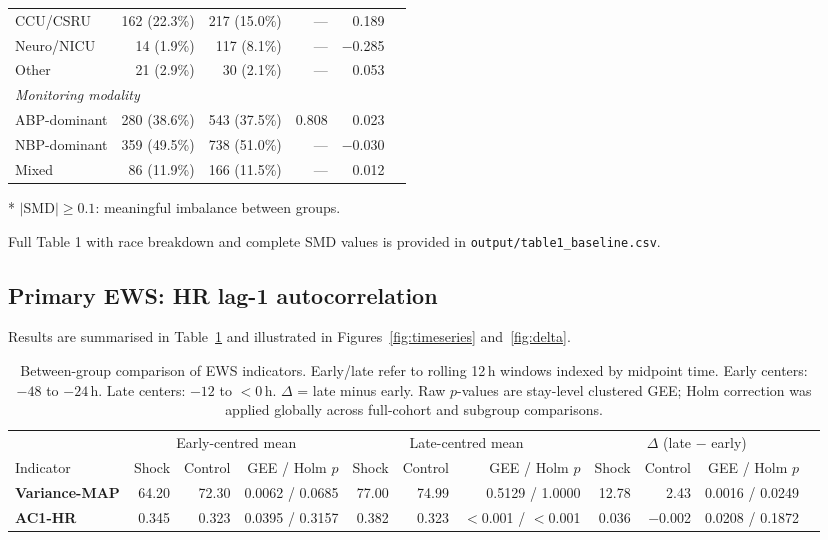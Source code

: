 \documentclass[referee,lineno,pdflatex]{sn-article-template/sn-jnl}
\begin{document}
\begin{table}[ht]
\begin{tabular}{lrrrrr}
CCU/CSRU              & 162 (22.3\%) & 217 (15.0\%) & --- & 0.189 \\
Neuro/NICU            & 14 (1.9\%)  & 117 (8.1\%)  & --- & $-$0.285 \\
Other                 & 21 (2.9\%)  & 30 (2.1\%)  & --- & 0.053 \\
\midrule
\multicolumn{5}{l}{\textit{Monitoring modality}} \\
ABP-dominant          & 280 (38.6\%) & 543 (37.5\%)  & 0.808 & 0.023 \\
NBP-dominant          & 359 (49.5\%) & 738 (51.0\%) & --- & $-$0.030 \\
Mixed                 & 86 (11.9\%) & 166 (11.5\%)  & --- & 0.012 \\
\bottomrule
\end{tabular}
\begin{tablenotes}
  \item[*] $|$SMD$| \geq 0.1$: meaningful imbalance between groups.
  \item Full Table 1 with race breakdown and complete SMD values is provided in
        \texttt{output/table1\_baseline.csv}.
\end{tablenotes}
\end{table}

\subsection{Primary EWS: HR lag-1 autocorrelation}
\label{sec:res-main}

Results are summarised in Table~\ref{tab:main} and illustrated in
Figures~\ref{fig:timeseries} and~\ref{fig:delta}.

\begin{table}
\caption{%
  Between-group comparison of EWS indicators.
  Early/late refer to rolling 12\,h windows indexed by midpoint time.
  Early centers: $-48$ to $-24$\,h. Late centers: $-12$ to $<0$\,h.
  $\Delta$ = late minus early.
  Raw $p$-values are stay-level clustered GEE; Holm correction was applied globally
  across full-cohort and subgroup comparisons.
}
\label{tab:main}
\begin{tabular}{lrrrrrrrrrr}
\toprule
 & \multicolumn{3}{c}{Early-centred mean} & \multicolumn{3}{c}{Late-centred mean} & \multicolumn{3}{c}{$\Delta$ (late $-$ early)} \\
\cmidrule(r){2-4} \cmidrule(r){5-7} \cmidrule(r){8-10}
Indicator & Shock & Control & GEE / Holm $p$ & Shock & Control & GEE / Holm $p$ & Shock & Control & GEE / Holm $p$ \\
\midrule
\textbf{Variance-MAP} & 64.20 & 72.30 & 0.0062 / 0.0685 & 77.00 & 74.99 & 0.5129 / 1.0000 & 12.78 & 2.43 & 0.0016 / 0.0249 \\
\textbf{AC1-HR}       & 0.345 & 0.323 & 0.0395 / 0.3157 & 0.382 & 0.323 & $<$0.001 / $<$0.001 & 0.036 & $-$0.002 & 0.0208 / 0.1872 \\
\bottomrule
\end{tabular}
\end{table}
\end{document}
